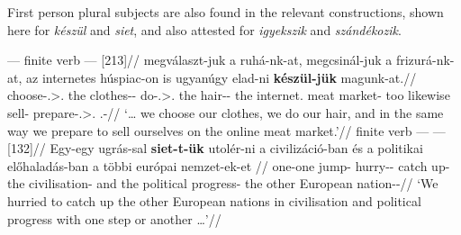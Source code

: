 First person plural subjects are also found in the relevant constructions,
shown here for \emph{készül} and \emph{siet}, and also attested for
\emph{igyekszik} and \emph{szándékozik}.

\ex\label{ex:meat-market}%
    \begingl
        \glpreamble \Inf --- finite verb --- \Obj{} [213]//
        \gla 	\nogloss{\dots} megválaszt-juk a ruhá-nk-at, megcsinál-juk a
        frizurá-nk-at, az internetes húspiac-on is ugyanúgy elad-ni
        \textbf{készül-jük} magunk-at.//
        \glb 	choose-\Fpl.\Sbj>\Third.\Obj{} the clothes-\Fpl-\Acc{} do-\Fpl.\Sbj>\Third.\Obj{} the hair-\Fpl-\Acc{} the internet.\Adj{} {meat market}-\Supe{} too likewise sell-\Inf{} prepare-\Fpl.\Sbj>\Third.\Obj{} \Refl.\Fpl-\Acc//
        \glft 	\enquote*{\dots{} we choose our clothes, we do our hair, and in the same way we prepare to sell ourselves on the online meat market.}\trailingcitation{}//
    \endgl
\xe
\ex
    \begingl
        \glpreamble finite verb --- \Inf{} --- \Obj{} [132]//
        \gla 	Egy-egy ugrás-sal \textbf{siet-t-ük} utolér-ni a civilizáció-ban és a politikai előhaladás-ban a többi európai nemzet-ek-et \nogloss{\dots}//
        \glb 	one-one jump-\Com{} hurry-\Pst-\Fpl{} {catch up}-\Inf{} the civilisation-\Ine{} and the political progress-\Ine{} the other European nation-\Pl-\Acc{}//
        \glft 	\enquote*{We hurried to catch up the other European nations in
        civilisation and political progress with one step or another \dots}//%
    \endgl
\xe


